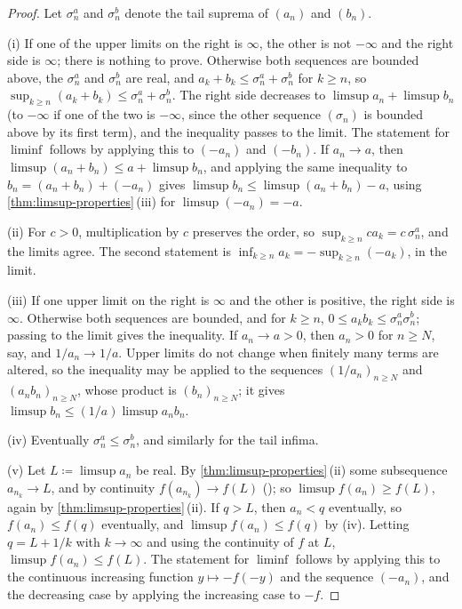 \begin{proof}
Let $\sigma_n^a$ and $\sigma_n^b$ denote the tail suprema of $(a_n)$ and $(b_n)$.

(i) If one of the upper limits on the right is $\infty$, the other is not $-\infty$ and the right side is $\infty$; there is nothing to prove. Otherwise both sequences are bounded above, the $\sigma_n^a$ and $\sigma_n^b$ are real, and $a_k+b_k\le\sigma_n^a+\sigma_n^b$ for $k\ge n$, so $\sup_{k\ge n}(a_k+b_k)\le\sigma_n^a+\sigma_n^b$. The right side decreases to $\limsup a_n+\limsup b_n$ (to $-\infty$ if one of the two is $-\infty$, since the other sequence $(\sigma_n)$ is bounded above by its first term), and the inequality passes to the limit. The statement for $\liminf$ follows by applying this to $(-a_n)$ and $(-b_n)$. If $a_n\to a$, then $\limsup(a_n+b_n)\le a+\limsup b_n$, and applying the same inequality to $b_n=(a_n+b_n)+(-a_n)$ gives $\limsup b_n\le\limsup(a_n+b_n)-a$, using \cref{thm:limsup-properties}\,(iii) for $\limsup(-a_n)=-a$.

(ii) For $c>0$, multiplication by $c$ preserves the order, so $\sup_{k\ge n}ca_k=c\,\sigma_n^a$, and the limits agree. The second statement is $\inf_{k\ge n}a_k=-\sup_{k\ge n}(-a_k)$, in the limit.

(iii) If one upper limit on the right is $\infty$ and the other is positive, the right side is $\infty$. Otherwise both sequences are bounded, and for $k\ge n$, $0\le a_kb_k\le\sigma_n^a\sigma_n^b$; passing to the limit gives the inequality. If $a_n\to a>0$, then $a_n>0$ for $n\ge N$, say, and $1/a_n\to1/a$. Upper limits do not change when finitely many terms are altered, so the inequality may be applied to the sequences $(1/a_n)_{n\ge N}$ and $(a_nb_n)_{n\ge N}$, whose product is $(b_n)_{n\ge N}$; it gives $\limsup b_n\le(1/a)\limsup a_nb_n$.

(iv) Eventually $\sigma_n^a\le\sigma_n^b$, and similarly for the tail infima.

(v) Let $L\coloneqq\limsup a_n$ be real. By \cref{thm:limsup-properties}\,(ii) some subsequence $a_{n_k}\to L$, and by continuity $f(a_{n_k})\to f(L)$ (); so $\limsup f(a_n)\ge f(L)$, again by \cref{thm:limsup-properties}\,(ii). If $q>L$, then $a_n<q$ eventually, so $f(a_n)\le f(q)$ eventually, and $\limsup f(a_n)\le f(q)$ by (iv). Letting $q=L+1/k$ with $k\to\infty$ and using the continuity of $f$ at $L$, $\limsup f(a_n)\le f(L)$. The statement for $\liminf$ follows by applying this to the continuous increasing function $y\mapsto-f(-y)$ and the sequence $(-a_n)$, and the decreasing case by applying the increasing case to $-f$.
\end{proof}

